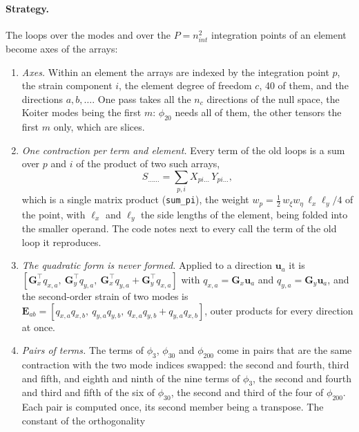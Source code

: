 \documentclass[11pt,a4paper]{article}
\begin{document}
\paragraph{Strategy.}  The loops over the modes and over the $P = n_{int}^2$
integration points of an element become axes of the arrays:
\begin{enumerate}\itemsep2pt
  \item \emph{Axes.}  Within an element the arrays are indexed by the
        integration point $p$, the strain component $i$, the element degree
        of freedom $c$, 40 of them, and the directions $a, b, \dots$.  One
        pass takes all the $n_c$ directions of the null space, the Koiter
        modes being the first $m$: $\phi_{20}$ needs all of them, the other
        tensors the first $m$ only, which are slices.
  \item \emph{One contraction per term and element.}  Every term of the old
        loops is a sum over $p$ and $i$ of the product of two such arrays,
        \[
        S_{\dots\dots} = \sum_{p,i} X_{pi\dots}\,Y_{pi\dots},
        \]
        which is a single matrix product (\texttt{sum\_pi}), the weight
        $w_p = \frac{1}{2}\,w_{\xi}w_{\eta}\,\ell_x\ell_y/4$ of the point,
        with $\ell_x$ and $\ell_y$ the side lengths of the element, being
        folded into the smaller operand.  The code notes next to every
        call the term of the old loop it reproduces.
  \item \emph{The quadratic form is never formed.}  Applied to a direction
        $\boldsymbol{u}_a$ it is
        $[\boldsymbol{G}_x^\top q_{x,a},\ \boldsymbol{G}_y^\top q_{y,a},\
        \boldsymbol{G}_x^\top q_{y,a} + \boldsymbol{G}_y^\top q_{x,a}]$ with
        $q_{x,a} = \boldsymbol{G}_x\boldsymbol{u}_a$ and
        $q_{y,a} = \boldsymbol{G}_y\boldsymbol{u}_a$, and the second-order
        strain of two modes is
        $\boldsymbol{E}_{ab} = [q_{x,a}q_{x,b},\ q_{y,a}q_{y,b},\
        q_{x,a}q_{y,b} + q_{y,a}q_{x,b}]$, outer products for every
        direction at once.
  \item \emph{Pairs of terms.}  The terms of $\phi_3$, $\phi_{30}$ and
        $\phi_{200}$ come in pairs that are the same contraction with the two
        mode indices swapped: the second and fourth, third and fifth, and
        eighth and ninth of the nine terms of $\phi_3$, the second and fourth
        and third and fifth of the six of $\phi_{30}$, the second and third
        of the four of $\phi_{200}$.  Each pair is computed once, its second
        member being a transpose.  The constant of the orthogonality

\end{enumerate}
\end{document}
